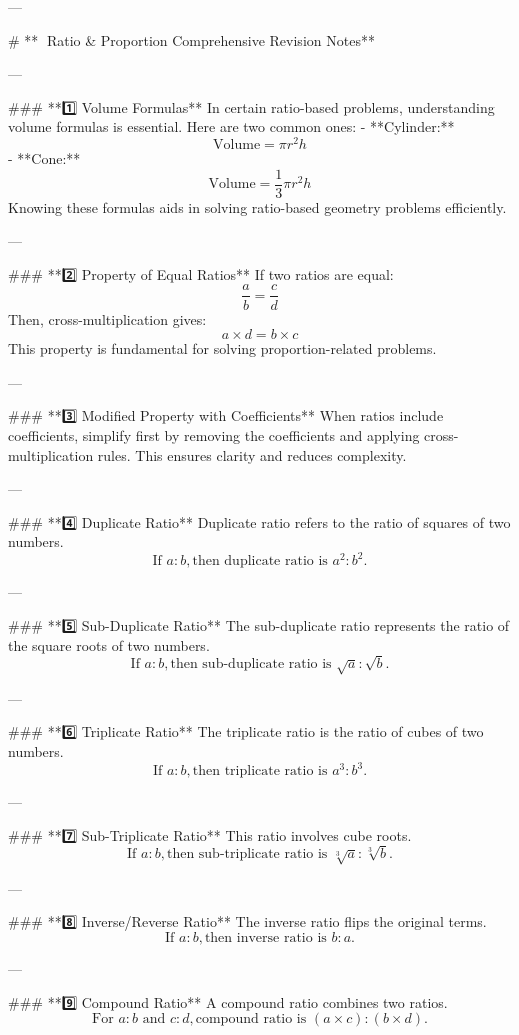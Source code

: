 
---

# **📖 Ratio & Proportion Comprehensive Revision Notes** 🎯  

---

### **1️⃣ Volume Formulas**  
In certain ratio-based problems, understanding volume formulas is essential. Here are two common ones:  
- **Cylinder:**  
\[
\text{Volume} = \pi r^2 h
\]  
- **Cone:**  
\[
\text{Volume} = \frac{1}{3} \pi r^2 h
\]  
Knowing these formulas aids in solving ratio-based geometry problems efficiently.

---

### **2️⃣ Property of Equal Ratios**  
If two ratios are equal:  
\[
\frac{a}{b} = \frac{c}{d}
\]  
Then, cross-multiplication gives:  
\[
a \times d = b \times c
\]  
This property is fundamental for solving proportion-related problems.

---

### **3️⃣ Modified Property with Coefficients**  
When ratios include coefficients, simplify first by removing the coefficients and applying cross-multiplication rules. This ensures clarity and reduces complexity.

---

### **4️⃣ Duplicate Ratio**  
Duplicate ratio refers to the ratio of squares of two numbers.  
\[
\text{If } a : b, \text{then duplicate ratio is } a^2 : b^2.
\]

---

### **5️⃣ Sub-Duplicate Ratio**  
The sub-duplicate ratio represents the ratio of the square roots of two numbers.  
\[
\text{If } a : b, \text{then sub-duplicate ratio is } \sqrt{a} : \sqrt{b}.
\]

---

### **6️⃣ Triplicate Ratio**  
The triplicate ratio is the ratio of cubes of two numbers.  
\[
\text{If } a : b, \text{then triplicate ratio is } a^3 : b^3.
\]

---

### **7️⃣ Sub-Triplicate Ratio**  
This ratio involves cube roots.  
\[
\text{If } a : b, \text{then sub-triplicate ratio is } \sqrt[3]{a} : \sqrt[3]{b}.
\]

---

### **8️⃣ Inverse/Reverse Ratio**  
The inverse ratio flips the original terms.  
\[
\text{If } a : b, \text{then inverse ratio is } b : a.
\]

---

### **9️⃣ Compound Ratio**  
A compound ratio combines two ratios.  
\[
\text{For } a : b \text{ and } c : d, \text{compound ratio is } (a \times c) : (b \times d).
\]

